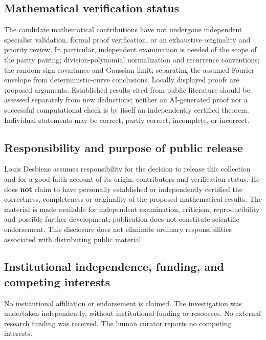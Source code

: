 \documentclass[
  11pt,
  a4paper,
]{article}
\begin{document}
\subsection{Mathematical verification
status}\label{mathematical-verification-status}

The candidate mathematical contributions have not undergone independent
specialist validation, formal proof verification, or an exhaustive
originality and priority review. In particular, independent examination
is needed of the scope of the parity pairing; division-polynomial
normalization and recurrence conventions; the random-sign covariance and
Gaussian limit; separating the assumed Fourier envelope from
deterministic-curve conclusions. Locally displayed proofs are proposed
arguments. Established results cited from public literature should be
assessed separately from new deductions; neither an AI-generated proof
nor a successful computational check is by itself an independently
certified theorem. Individual statements may be correct, partly correct,
incomplete, or incorrect.

\subsection{Responsibility and purpose of public
release}\label{responsibility-and-purpose-of-public-release}

Louis Desbiens assumes responsibility for the decision to release this
collection and for a good-faith account of its origin, contributors and
verification status. He does \textbf{not} claim to have personally
established or independently certified the correctness, completeness or
originality of the proposed mathematical results. The material is made
available for independent examination, criticism, reproducibility and
possible further development; publication does not constitute scientific
endorsement. This disclosure does not eliminate ordinary
responsibilities associated with distributing public material.

\subsection{Institutional independence, funding, and competing
interests}\label{institutional-independence-funding-and-competing-interests}

No institutional affiliation or endorsement is claimed. The
investigation was undertaken independently, without institutional
funding or resources. No external research funding was received. The
human curator reports no competing interests.
\end{document}
